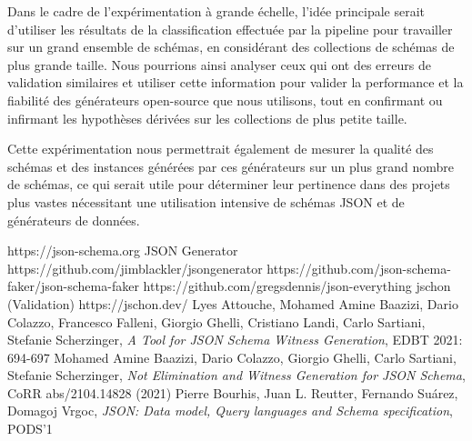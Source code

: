 \documentclass{article}
\begin{document}
    Dans le cadre de l'expérimentation à grande échelle, l'idée principale serait d'utiliser les résultats de la classification effectuée par la pipeline pour travailler sur un grand ensemble de schémas, en considérant des collections de schémas de plus grande taille. Nous pourrions ainsi analyser ceux qui ont des erreurs de validation similaires et utiliser cette information pour valider la performance et la fiabilité des générateurs open-source que nous utilisons, tout en confirmant ou infirmant les hypothèses dérivées sur les collections de plus petite taille.

    Cette expérimentation nous permettrait également de mesurer la qualité des schémas et des instances générées par ces générateurs sur un plus grand nombre de schémas, ce qui serait utile pour déterminer leur pertinence dans des projets plus vastes nécessitant une utilisation intensive de schémas JSON et de générateurs de données.

    


\newpage

\begin{thebibliography}{8}

https://json-schema.org
JSON Generator https://github.com/jimblackler/jsongenerator
\jsf https://github.com/json-schema-faker/json-schema-faker
\je https://github.com/gregsdennis/json-everything
jschon (Validation) https://jschon.dev/
Lyes Attouche, Mohamed Amine Baazizi, Dario Colazzo, Francesco Falleni, Giorgio Ghelli, Cristiano Landi, Carlo Sartiani, Stefanie Scherzinger,  \emph{A Tool for JSON Schema Witness Generation}, EDBT 2021: 694-697
Mohamed Amine Baazizi, Dario Colazzo, Giorgio Ghelli, Carlo Sartiani, Stefanie Scherzinger, \emph{Not Elimination and Witness Generation for JSON Schema}, CoRR abs/2104.14828 (2021)
Pierre Bourhis, Juan L. Reutter, Fernando Suárez, Domagoj Vrgoc,  \emph{JSON: Data model, Query languages and Schema specification}, PODS’1

\end{thebibliography}
\end{document}
